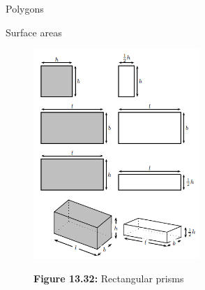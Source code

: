 \begin{exercises}{Polygons}
\begin{exercises}{Surface areas }
	\begin{figure}[H] %
    \begin{center}
    \label{m39357*id63644234!!!underscore!!!media}\label{m39357*id63644234!!!underscore!!!printimage}\includegraphics[height=300px]{col11306.imgs/m39357_MG10C14_008.png} %
        
      \vspace{2pt}
    \vspace{\rubberspace}\par \begin{cnxcaption}
	  \small \textbf{Figure 13.32: }Rectangular prisms
	\end{cnxcaption}
      
    \vspace{.1in}
    
    \end{center}

 \end{figure}   

    \addtocounter{footnote}{-0}
    \par 
 
    
          \begin{table}[H]
        
    
        \begin{center}
      
      \label{m39357*eip-742}
      
    \noindent
      \tablelasttail{}
      \begin{xtabular}[t]{|l|l|}\hline
    

\end{xtabular}
\end{center}
\end{table}
\end{exercises}
\end{exercises}

